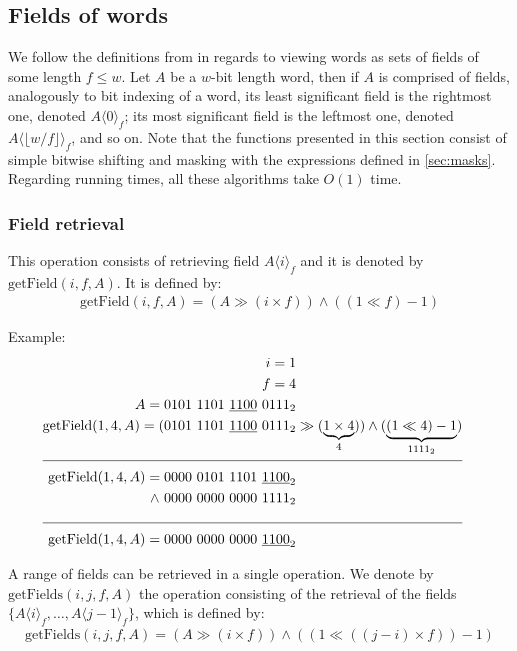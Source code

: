 \subsection{Fields of words} \label{sec:fieldsOfWords}

We follow the definitions from \cite{patrascu2014dynamic} in regards to viewing words as sets of fields of some length $f \leq w$. Let $A$ be a $w$-bit length word, then if $A$ is comprised of fields, analogously to bit indexing of a word, its least significant field is the rightmost one, denoted $A\langle0\rangle_f$; its most significant field is the leftmost one, denoted $A\langle \lfloor w/f \rfloor \rangle_f$, and so on.
Note that the functions presented in this section consist of simple bitwise shifting and masking with the expressions defined in \ref{sec:masks}. Regarding running times, all these algorithms take $O(1)$ time.

\subsubsection{Field retrieval} \label{sec:fieldRetrieval}

This operation consists of retrieving field $A\langle i\rangle_f$ and it is denoted by $\text{getField}(i, f, A)$. It is defined by:
\begin{align*}
    \text{getField}(i, f, A) = (A \gg (i \times f)) \wedge ((1 \ll f) - 1)
\end{align*}

Example:
\begin{align*}
    i = 1\\
    f = 4\\
    A = 0101\ 1101\ \underline{1100}\ 0111_2& \\
    \text{getField}(1, 4, A) = (0101\ 1101\ \underline{1100}\ 0111_2& \gg (\underbrace{1 \times 4}_{4})) \wedge (\underbrace{(1 \ll 4) - 1}_{1111_2})\\
    \cline{1-2}
    \text{getField}(1, 4, A) = 0000\ 0101\ 1101\ \underline{1100}_2& \\
    \wedge\ 0000\ 0000\ 0000\ 1111_2& \\
    \cline{1-2}
    \text{getField}(1, 4, A) = 0000\ 0000\ 0000\ \underline{1100}_2&
\end{align*}

A range of fields can be retrieved in a single operation. We denote by $\text{getFields}(i, j, f, A)$ the operation consisting of the retrieval of the fields $\{A\langle i\rangle_f,\dots , A\langle j-1\rangle_f\}$, which is defined by:
\begin{align*}
    \text{getFields}(i, j, f, A) = (A \gg (i \times f)) \wedge ((1 \ll ((j - i) \times f)) - 1)
\end{align*}

